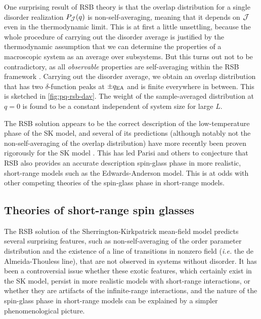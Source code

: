 One surprising result of RSB theory is that the overlap distribution for a
single disorder realization $P_{\mathcal{J}}(q)$ is non-self-averaging, meaning that it
depends on $\mathcal{J}$ even in the thermodynamic limit. This is at first a little
unsettling, because the whole procedure of carrying out the disorder average is
justified by the thermodynamic assumption that we can determine the properties
of a macroscopic system as an average over subsystems. But this turns out not
to be contradictory, as all \emph{observable} properties are self-averaging
within the RSB framework \autocite{stein2013spin}. Carrying out the disorder
average, we obtain an overlap distribution that has two $\delta$-function peaks
at $\pm q_{\mathrm{EA}}$ and is finite everywhere in between. This is sketched in
\cref{fig:pq-rsb-dav}. The weight of the sample-averaged distribution at $q=0$
is found to be a constant independent of system size for large $L$.

The RSB solution appears to be the correct description of the low-temperature
phase of the SK model, and several of its predictions (although notably not the
non-self-averaging of the overlap distribution) have more recently been proven
rigorously for the SK model \autocite{talagrand2003spin}. This has led Parisi
and others to conjecture that RSB also provides an accurate description
spin-glass phase in more realistic, short-range models such as the
Edwards-Anderson model. This is at odds with other competing theories of the
spin-glass phase in short-range models.


\subsection{Theories of short-range spin glasses}
\label{sec:intro-theories}

The RSB solution of the Sherrington-Kirkpatrick mean-field model predicts
several surprising features, such as non-self-averaging of the order parameter
distribution and the existence of a line of transitions in nonzero field
(\textit{i.e.} the de Almeida-Thouless line), that are not observed in systems
without disorder. It has been a controversial issue whether these exotic
features, which certainly exist in the SK model, persist in more realistic
models with short-range interactions, or whether they are artifacts of the
infinite-range interactions, and the nature of the spin-glass phase in
short-range models can be explained by a simpler phenomenological picture.

